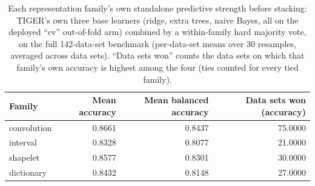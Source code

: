 \begin{table}[t]
\centering
\begin{tabular}{lrrr}
\toprule
Family & Mean accuracy & Mean balanced accuracy & Data sets won (accuracy) \\
\midrule
convolution & 0.8661 & 0.8437 & 75.0000 \\
interval & 0.8328 & 0.8077 & 21.0000 \\
shapelet & 0.8577 & 0.8301 & 30.0000 \\
dictionary & 0.8432 & 0.8148 & 27.0000 \\
\bottomrule
\end{tabular}
\caption{Each representation family's own standalone predictive strength before stacking: TIGER's own three base learners (ridge, extra trees, naive Bayes, all on the deployed ``cv'' out-of-fold arm) combined by a within-family hard majority vote, on the full 142-data-set benchmark (per-data-set means over 30 resamples, averaged across data sets). ``Data sets won'' counts the data sets on which that family's own accuracy is highest among the four (ties counted for every tied family).}
\label{tab:family-standalone-strength}
\end{table}